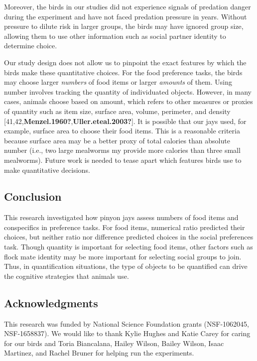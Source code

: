 \documentclass[
  ,doc,floatsintext]{apa6}
\begin{document}
Moreover, the birds in our studies did not experience signals of predation danger during the experiment and have not faced predation pressure in years. Without pressure to dilute risk in larger groups, the birds may have ignored group size, allowing them to use other information such as social partner identity to determine choice.

Our study design does not allow us to pinpoint the exact features by which the birds make these quantitative choices. For the food preference tasks, the birds may choose larger \emph{numbers} of food items or larger \emph{amounts} of them. Using number involves tracking the quantity of individuated objects. However, in many cases, animals choose based on amount, which refers to other measures or proxies of quantity such as item size, surface area, volume, perimeter, and density {[}41,42,\textbf{Menzel.1960?},\textbf{Uller.eteal.2003?}{]}. It is possible that our jays used, for example, surface area to choose their food items. This is a reasonable criteria because surface area may be a better proxy of total calories than absolute number (i.e., two large mealworms my provide more calories than three small mealworms). Future work is needed to tease apart which features birds use to make quantitative decisions.

\hypertarget{conclusion}{%
\subsection{Conclusion}\label{conclusion}}

This research investigated how pinyon jays assess numbers of food items and conspecifics in preference tasks. For food items, numerical ratio predicted their choices, but neither ratio nor difference predicted choices in the social preferences task. Though quantity is important for selecting food items, other factors such as flock mate identity may be more important for selecting social groups to join. Thus, in quantification situations, the type of objects to be quantified can drive the cognitive strategies that animals use.

\hypertarget{acknowledgments}{%
\subsection{Acknowledgments}\label{acknowledgments}}

This research was funded by National Science Foundation grants (NSF-1062045,
NSF-1658837). We would like to thank Kylie Hughes and Katie Carey for caring for our birds and Toria Biancalana, Hailey Wilson, Bailey Wilson, Isaac Martinez, and Rachel Bruner for helping run the experiments.
\end{document}
